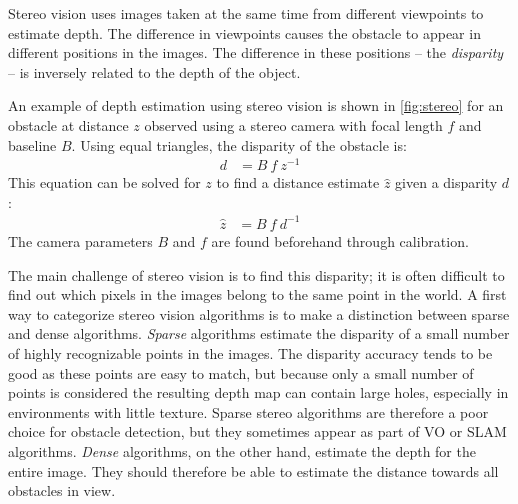 Stereo vision uses images taken at the same time from different viewpoints to estimate depth.
The difference in viewpoints causes the obstacle to appear in different positions in the images.
The difference in these positions -- the \emph{disparity} -- is inversely related to the depth of the object.

An example of depth estimation using stereo vision is shown in \autoref{fig:stereo} for an obstacle at distance $z$ observed using a stereo camera with focal length $f$ and baseline $B$.
Using equal triangles, the disparity of the obstacle is:
\begin{align}
d &= B \ f \ z^{-1}
\end{align}
This equation can be solved for $z$ to find a distance estimate $\hat z$ given a disparity $d$:
\begin{align}
\hat z &= B \ f \ d^{-1}
\end{align}
The camera parameters $B$ and $f$ are found beforehand through calibration.

The main challenge of stereo vision is to find this disparity; it is often difficult to find out which pixels in the images belong to the same point in the world.
A first way to categorize stereo vision algorithms is to make a distinction between sparse and dense algorithms.
\emph{Sparse} algorithms estimate the disparity of a small number of highly recognizable points in the images.
The disparity accuracy tends to be good as these points are easy to match, but because only a small number of points is considered  the resulting depth map can contain large holes, especially in environments with little texture.
Sparse stereo algorithms are therefore a poor choice for obstacle detection, but they sometimes appear as part of \ac{VO} or \ac{SLAM} algorithms.
\emph{Dense} algorithms, on the other hand, estimate the depth for the entire image.
They should therefore be able to estimate the distance towards all obstacles in view.

